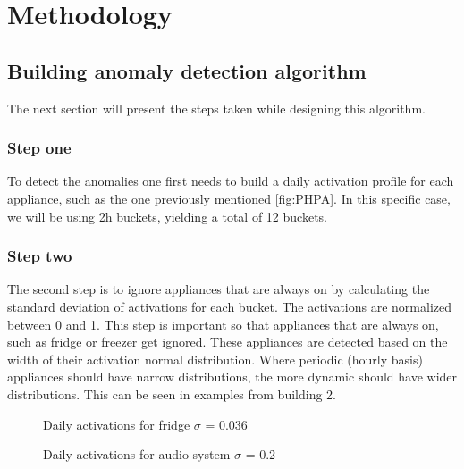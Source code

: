 \section{Methodology}

\subsection{Building anomaly detection algorithm}

The next section will present the steps taken while designing this algorithm.

\subsubsection{Step one}
To detect the anomalies one first needs to build a daily activation profile for each appliance, such as the one previously mentioned \ref{fig:PHPA}.
In this specific case, we will be using 2h buckets, yielding a total of 12 buckets. 

\subsubsection{Step two}
The second step is to ignore appliances that are always on by calculating the standard deviation of activations for each bucket. 
The activations are normalized between 0 and 1. 
This step is important so that appliances that are always on, such as fridge or freezer get ignored. 
These appliances are detected based on the width of their activation normal distribution. 
Where periodic (hourly basis) appliances should have narrow distributions, the more dynamic should have wider distributions.
This can be seen in examples from building 2.

\begin{figure}[H]
    \centering
    \caption{Daily activations for fridge $\sigma$ = 0.036}
    \label{arr:fridge_acts}
\end{figure}

\begin{figure}[H]
    \centering
    \caption{Daily activations for audio system $\sigma$ = 0.2}
    \label{arr:as_acts}
\end{figure}

